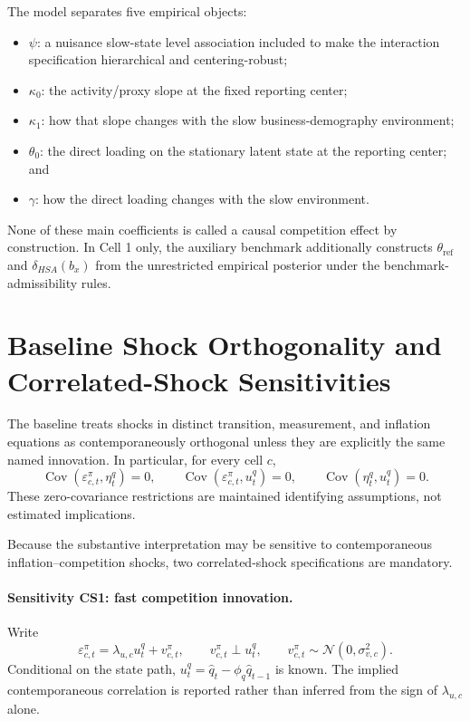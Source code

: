 \documentclass[11pt]{article}
\newcommand{\Cov}{\operatorname{Cov}}
\newcommand{\Normal}{\mathcal{N}}
\begin{document}
The model separates five empirical objects:
\begin{itemize}
\item $\psi$: a nuisance slow-state level association included to make the interaction specification hierarchical and centering-robust;
\item $\kappa_0$: the activity/proxy slope at the fixed reporting center;
\item $\kappa_1$: how that slope changes with the slow business-demography environment;
\item $\theta_0$: the direct loading on the stationary latent state at the reporting center; and
\item $\gamma$: how the direct loading changes with the slow environment.
\end{itemize}
None of these main coefficients is called a causal competition effect by construction. In Cell 1 only, the auxiliary benchmark additionally constructs $\theta_{\mathrm{ref}}$ and $\delta_{HSA}(b_x)$ from the unrestricted empirical posterior under the benchmark-admissibility rules.

\section{Baseline Shock Orthogonality and Correlated-Shock Sensitivities}

The baseline treats shocks in distinct transition, measurement, and inflation equations as contemporaneously orthogonal unless they are explicitly the same named innovation. In particular, for every cell $c$,
\begin{equation}
\Cov(\varepsilon_{c,t}^{\pi},\eta_t^q)=0,
\qquad
\Cov(\varepsilon_{c,t}^{\pi},u_t^q)=0,
\qquad
\Cov(\eta_t^q,u_t^q)=0.
\end{equation}
These zero-covariance restrictions are maintained identifying assumptions, not estimated implications.

Because the substantive interpretation may be sensitive to contemporaneous inflation--competition shocks, two correlated-shock specifications are mandatory.

\paragraph{Sensitivity CS1: fast competition innovation.}
Write
\begin{equation}
\varepsilon_{c,t}^{\pi}
=
\lambda_{u,c}u_t^q+v_{c,t}^{\pi},
\qquad
v_{c,t}^{\pi}\perp u_t^q,
\qquad
v_{c,t}^{\pi}\sim\Normal(0,\sigma_{v,c}^2).
\label{eq:cs1}
\end{equation}
Conditional on the state path, $u_t^q=\hat q_t-\phi_q\hat q_{t-1}$ is known. The implied contemporaneous correlation is reported rather than inferred from the sign of $\lambda_{u,c}$ alone.
\end{document}
